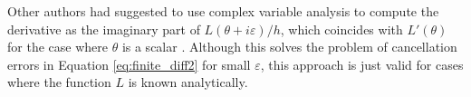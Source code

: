 Other authors had suggested to use complex variable analysis to compute the derivative as the imaginary part of $L(\theta + i \varepsilon)/h$, which coincides with $L'(\theta)$ for the case where $\theta$ is a scalar \cite{Squire_Trapp_1998_complex_diff, Martins_Sturdza_Alonso_2003_complex_differentiation}.
Although this solves the problem of cancellation errors in Equation \eqref{eq:finite_diff2} for small $\varepsilon$, this approach is just valid for cases where the function $L$ is known analytically. 

